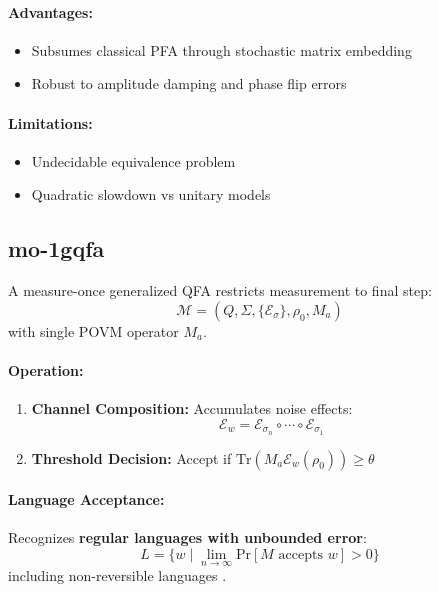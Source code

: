 \paragraph{Advantages:}
\begin{itemize}
    \item Subsumes classical PFA through stochastic matrix embedding
    \item Robust to amplitude damping and phase flip errors
\end{itemize}

\paragraph{Limitations:}
\begin{itemize}
    \item Undecidable equivalence problem
    \item Quadratic slowdown vs unitary models
\end{itemize}

\subsection{\acrfull{mo-1gqfa}}
\label{subsec:mo-1gqfa}

\begin{definition}
A measure-once generalized QFA restricts measurement to final step:
\[
\mathcal{M} = (Q, \Sigma, \{\mathcal{E}_\sigma\}, \rho_0, M_a)
\]
with single POVM operator $M_a$.
\end{definition}

\paragraph{Operation:}
\begin{enumerate}
    \item \textbf{Channel Composition:} Accumulates noise effects:
    \[
    \mathcal{E}_w = \mathcal{E}_{\sigma_n} \circ \cdots \circ \mathcal{E}_{\sigma_1}
    \]
    \item \textbf{Threshold Decision:} Accept if $\text{Tr}(M_a\mathcal{E}_w(\rho_0)) \geq \theta$
\end{enumerate}

\paragraph{Language Acceptance:}
Recognizes \textbf{regular languages with unbounded error}:
\[
L = \{w \mid \lim_{n\to\infty} \text{Pr}[M \text{ accepts } w] > 0\}
\]
including non-reversible languages \cite{hirvensalo2012quantum}.

